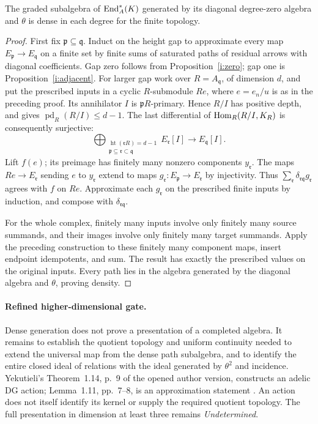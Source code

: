 \begin{proposition}\label{i:dense}
The graded subalgebra of $\operatorname{End}_A^*(K)$ generated by its diagonal
degree-zero algebra and $\theta$ is dense in each degree for the
finite topology.
\end{proposition}
\begin{proof}
First fix $\mathfrak p\subseteq\mathfrak q$. Induct on the height
gap to approximate every map $E_{\mathfrak p}\to E_{\mathfrak q}$
on a finite set by finite sums of saturated paths of residual
arrows with diagonal coefficients. Gap zero follows from
Proposition~\ref{i:zero}; gap one is Proposition~\ref{i:adjacent}.
For larger gap work over $R=A_{\mathfrak q}$, of dimension $d$,
and put the prescribed inputs in a cyclic $R$-submodule $Re$,
where $e=e_n/u$ is as in the preceding proof. Its annihilator $I$
is $\mathfrak pR$-primary. Hence $R/I$ has positive depth, and
\cite[Proposition 10.110.1]{StacksRegularResolution} gives
$\operatorname{pd}_R(R/I)\leq d-1$.
The last differential of $\operatorname{Hom}_R(R/I,K_R)$ is consequently
surjective:
\[
 \bigoplus_{\substack{\operatorname{ht}(\mathfrak rR)=d-1\\
                      \mathfrak p\subseteq\mathfrak r\subset\mathfrak q}}
 E_{\mathfrak r}[I]\longrightarrow E_{\mathfrak q}[I].
\]
Lift $f(e)$; its preimage has finitely many nonzero components
$y_{\mathfrak r}$. The maps $Re\to E_{\mathfrak r}$ sending
$e$ to $y_{\mathfrak r}$ extend to maps
$g_{\mathfrak r}:E_{\mathfrak p}\to E_{\mathfrak r}$ by
injectivity. Thus $\sum_{\mathfrak r}
\delta_{\mathfrak r\mathfrak q}g_{\mathfrak r}$ agrees with
$f$ on $Re$. Approximate each $g_{\mathfrak r}$ on the prescribed
finite inputs by induction, and compose with
$\delta_{\mathfrak r\mathfrak q}$.

For the whole complex, finitely many inputs involve only finitely
many source summands, and their images involve only finitely many
target summands. Apply the preceding construction to these finitely
many component maps, insert endpoint idempotents, and sum. The
result has exactly the prescribed values on the original inputs.
Every path lies in the algebra generated by the diagonal algebra
and $\theta$, proving density.
\end{proof}

\paragraph{Refined higher-dimensional gate.}
Dense generation does not prove a presentation of a completed
algebra. It remains to establish the quotient topology and uniform
continuity needed to extend the universal map from the dense path
subalgebra, and to identify the entire closed ideal of relations
with the ideal generated by $\theta^2$ and incidence.
Yekutieli's Theorem~1.14, p.~9 of the opened author version,
constructs an adelic DG action; Lemma~1.11, pp.~7--8, is an
approximation statement \cite{Yekutieli2003}. An action does not
itself identify its kernel or supply the required quotient topology.
The full presentation in dimension at least three remains
\emph{Undetermined}.

